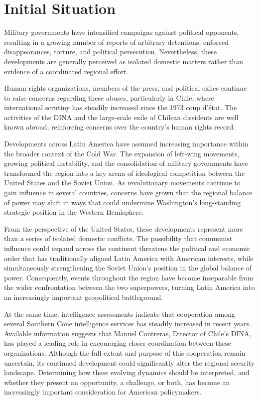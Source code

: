 \section{Initial Situation}


Military governments have intensified campaigns against political opponents, resulting in a growing number of reports of arbitrary detentions, enforced disappearances, torture, and political persecution. Nevertheless, these developments are generally perceived as isolated domestic matters rather than evidence of a coordinated regional effort.

Human rights organizations, members of the press, and political exiles continue to raise concerns regarding these abuses, particularly in Chile, where international scrutiny has steadily increased since the 1973 coup d’état. The activities of the DINA and the large-scale exile of Chilean dissidents are well known abroad, reinforcing concerns over the country’s human rights record.

Developments across Latin America have assumed increasing importance within the broader context of the Cold War. The expansion of left-wing movements, growing political instability, and the consolidation of military governments have transformed the region into a key arena of ideological competition between the United States and the Soviet Union. As revolutionary movements continue to gain influence in several countries, concerns have grown that the regional balance of power may shift in ways that could undermine Washington's long-standing strategic position in the Western Hemisphere.

From the perspective of the United States, these developments represent more than a series of isolated domestic conflicts. The possibility that communist influence could expand across the continent threatens the political and economic order that has traditionally aligned Latin America with American interests, while simultaneously strengthening the Soviet Union's position in the global balance of power. Consequently, events throughout the region have become inseparable from the wider confrontation between the two superpowers, turning Latin America into an increasingly important geopolitical battleground.

At the same time, intelligence assessments indicate that cooperation among several Southern Cone intelligence services has steadily increased in recent years. Available information suggests that Manuel Contreras, Director of Chile's DINA, has played a leading role in encouraging closer coordination between these organizations. Although the full extent and purpose of this cooperation remain uncertain, its continued development could significantly alter the regional security landscape. Determining how these evolving dynamics should be interpreted, and whether they present an opportunity, a challenge, or both, has become an increasingly important consideration for American policymakers.
